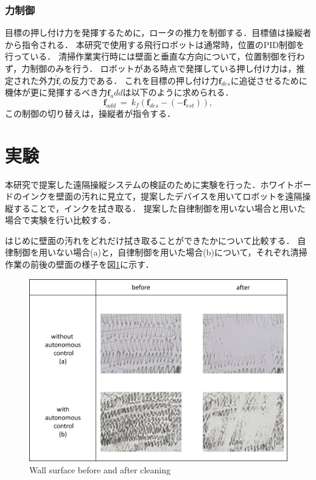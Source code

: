 \documentclass{jarticle}
\begin{document}
\subsubsection{力制御}
目標の押し付け力を発揮するために，ロータの推力を制御する．目標値は操縦者から指令される．
本研究で使用する飛行ロボットは通常時，位置のPID制御を行っている．
清掃作業実行時には壁面と垂直な方向について，位置制御を行わず，力制御のみを行う．
ロボットがある時点で発揮している押し付け力は，推定された外力$\hat{\bm{f}}_e$の反力である．
これを目標の押し付け力$\bm{f}_{des}$に追従させるために機体が更に発揮するべき力$\bm{f}_add$は以下のように求められる．
\begin{equation}
    \bm{f}_{add} ~=~ k_f (\bm{f}_{des} - (-\bm{f}_{est}) ) ,
\end{equation}
この制御の切り替えは，操縦者が指令する．

\section{実験}

本研究で提案した遠隔操縦システムの検証のために実験を行った．ホワイトボードのインクを壁面の汚れに見立て，提案したデバイスを用いてロボットを遠隔操縦することで，インクを拭き取る．
提案した自律制御を用いない場合と用いた場合で実験を行い比較する．

はじめに壁面の汚れをどれだけ拭き取ることができたかについて比較する．
自律制御を用いない場合(a)と，自律制御を用いた場合(b)について，それぞれ清掃作業の前後の壁面の様子を図\ref{fig:wall_compare}に示す．
\begin{figure}[tb]
    \centering
    \includegraphics[width=0.8\columnwidth]{figs/wall_compare}
    \caption{Wall surface before and after cleaning}
    \label{fig:wall_compare}
\end{figure}
\end{document}
